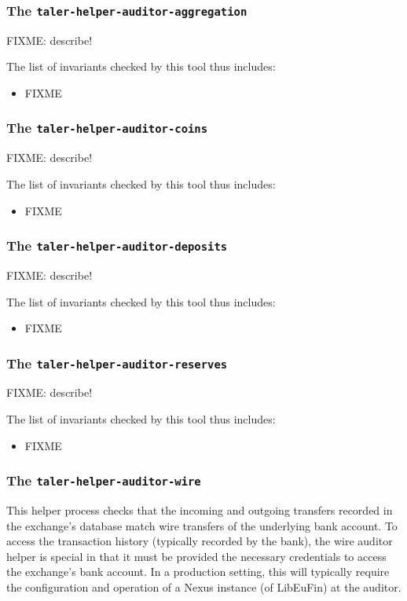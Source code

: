 \subsubsection{The \texttt{taler-helper-auditor-aggregation}}

FIXME: describe!

The list of invariants checked by this tool thus includes:
\begin{itemize}
  \item FIXME
\end{itemize}


\subsubsection{The \texttt{taler-helper-auditor-coins}}

FIXME: describe!

The list of invariants checked by this tool thus includes:
\begin{itemize}
  \item FIXME
\end{itemize}


\subsubsection{The \texttt{taler-helper-auditor-deposits}}

FIXME: describe!

The list of invariants checked by this tool thus includes:
\begin{itemize}
  \item FIXME
\end{itemize}


\subsubsection{The \texttt{taler-helper-auditor-reserves}}

FIXME: describe!

The list of invariants checked by this tool thus includes:
\begin{itemize}
  \item FIXME
\end{itemize}


\subsubsection{The \texttt{taler-helper-auditor-wire}}

This helper process checks that the incoming and outgoing transfers recorded
in the exchange's database match wire transfers of the underlying bank
account.  To access the transaction history (typically recorded by the bank),
the wire auditor helper is special in that it must be provided the necessary
credentials to access the exchange's bank account.  In a production setting,
this will typically require the configuration and operation of a Nexus
instance (of LibEuFin) at the auditor.

